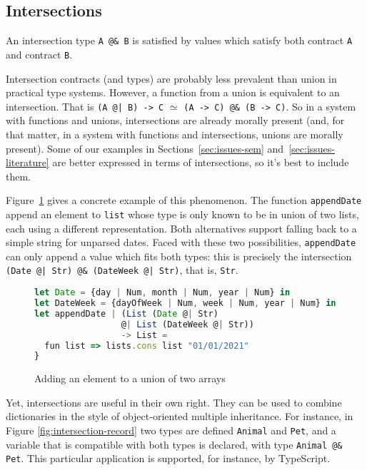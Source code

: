\documentclass[sigplan,10pt,review,anonymous]{acmart}
\newcommand{\nickel}[1]{\lstinline[language=nickel]{#1}}
\begin{document}
\subsection{Intersections}

An intersection type \nickel{A @& B} is satisfied by values which
satisfy both contract \nickel{A} and contract \nickel{B}.

Intersection contracts (and types) are probably less prevalent than union in
practical type systems. However, a function from a union is equivalent to an
intersection. That is \nickel{(A @| B) -> C} $\simeq$ \nickel{(A -> C) @& (B ->
C)}. So in a system with functions and unions, intersections are already morally
present (and, for that matter, in a system with functions and intersections,
unions are morally present). Some of our examples in
Sections~\ref{sec:issues-sem} and~\ref{sec:issues-literature} are better
expressed in terms of intersections, so it's best to include them.

Figure~\ref{fig:addElem} gives a concrete example of this phenomenon. The
function \nickel{appendDate} append an element to \nickel{list} whose type is
only known to be in union of two lists, each using a different representation.
Both alternatives support falling back to a simple string for unparsed dates.
Faced with these two possibilities, \nickel{appendDate} can only append a
value which fits both types: this is precisely the intersection
\nickel{(Date @| Str) @& (DateWeek @| Str)}, that is, \nickel{Str}.

\begin{figure}[h]
\begin{lstlisting}[language=JavaScript]
let Date = {day | Num, month | Num, year | Num} in
let DateWeek = {dayOfWeek | Num, week | Num, year | Num} in
let appendDate | (List (Date @| Str)
                 @| List (DateWeek @| Str))
                 -> List =
  fun list => lists.cons list "01/01/2021"
}
\end{lstlisting}
\caption{Adding an element to a union of two arrays}
\label{fig:addElem}
\end{figure}

Yet, intersections are useful in their own right. They can be used to
combine dictionaries in the style of object-oriented multiple inheritance. For instance, in
Figure \ref{fig:intersection-record} two types are defined
\nickel{Animal} and \nickel{Pet}, and a variable that is compatible
with both types is declared, with type \nickel{Animal @& Pet}. This
particular application is supported, for instance, by TypeScript.
\end{document}
